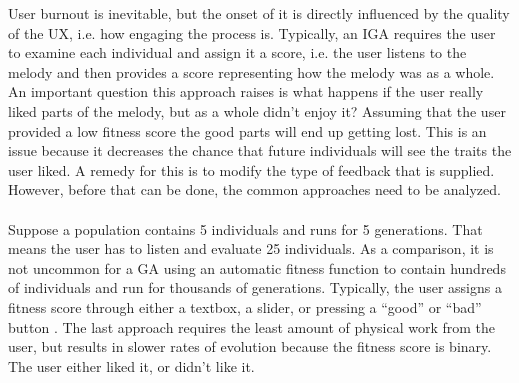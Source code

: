 \documentclass[12pt]{article} %
\begin{document}
User burnout is inevitable, but the onset of it is directly influenced by the quality of the UX, i.e. how engaging the process is. Typically, an IGA requires the user to examine each individual and assign it a score, i.e. the user listens to the melody and then provides a score representing how the melody was as a whole. An important question this approach raises is what happens if the user really liked parts of the melody, but as a whole didn't enjoy it? Assuming that the user provided a low fitness score the good parts will end up getting lost. This is an issue because it decreases the chance that future individuals will see the traits the user liked. A remedy for this is to modify the type of feedback that is supplied. However, before that can be done, the common approaches need to be analyzed. \\
\\
Suppose a population contains 5 individuals and runs for 5 generations. That means the user has to listen and evaluate 25 individuals. As a comparison, it is not uncommon for a GA using an automatic fitness function to contain hundreds of individuals and run for thousands of generations. Typically, the user assigns a fitness score through either a textbox, a slider, or pressing a “good” or “bad” button \cite{Biles94}. The last approach requires the least amount of physical work from the user, but results in slower rates of evolution because the fitness score is binary. The user either liked it, or didn't like it. \\
\\
\end{document}
